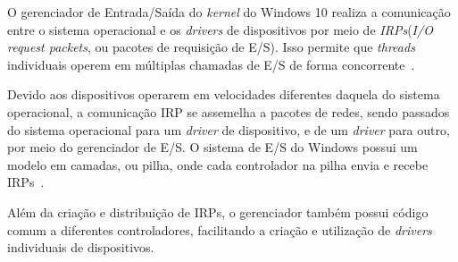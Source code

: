 O gerenciador de Entrada/Saída do \emph{kernel} do Windows 10 realiza a comunicação entre o sistema operacional e os \emph{drivers} de dispositivos por meio de \emph{IRPs}(\emph{I/O request packets}, ou pacotes de requisição de E/S). Isso permite que \emph{threads} individuais operem em múltiplas chamadas de E/S de forma concorrente~\cite{internals_pt2}.

Devido aos dispositivos operarem em velocidades diferentes daquela do sistema operacional, a comunicação IRP se assemelha a pacotes de redes, sendo passados do sistema operacional para um \emph{driver} de dispositivo, e de um \emph{driver} para outro, por meio do gerenciador de E/S. O sistema de E/S do Windows possui um modelo em camadas, ou pilha, onde cada controlador na pilha envia e recebe IRPs~\cite{w10_io_manager}.



Além da criação e distribuição de IRPs, o gerenciador também possui código comum a diferentes controladores, facilitando a criação e utilização de \emph{drivers} individuais de dispositivos.

